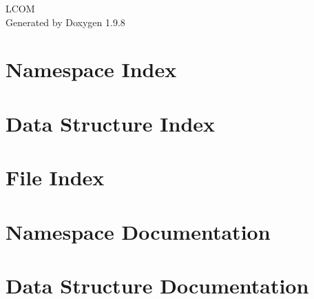 \documentclass[twoside]{book}
\newcommand{\+}{\discretionary{\mbox{\scriptsize$\hookleftarrow$}}{}{}}
\newcommand{\clearemptydoublepage}{%
    \newpage{\pagestyle{empty}\cleardoublepage}%
  }
\begin{document}
  \raggedbottom
    \hypersetup{pageanchor=false,
                bookmarksnumbered=true,
                pdfencoding=unicode
               }
  \begin{titlepage}
  \vspace*{7cm}
  \begin{center}%
  {\Large LCOM}\\
  \vspace*{1cm}
  {\large Generated by Doxygen 1.9.8}\\
  \end{center}
  \end{titlepage}
  \clearemptydoublepage
  \tableofcontents
  \clearemptydoublepage
  \hypersetup{pageanchor=true}
\chapter{Namespace Index}

\chapter{Data Structure Index}

\chapter{File Index}

\chapter{Namespace Documentation}

\chapter{Data Structure Documentation}




















\end{document}
